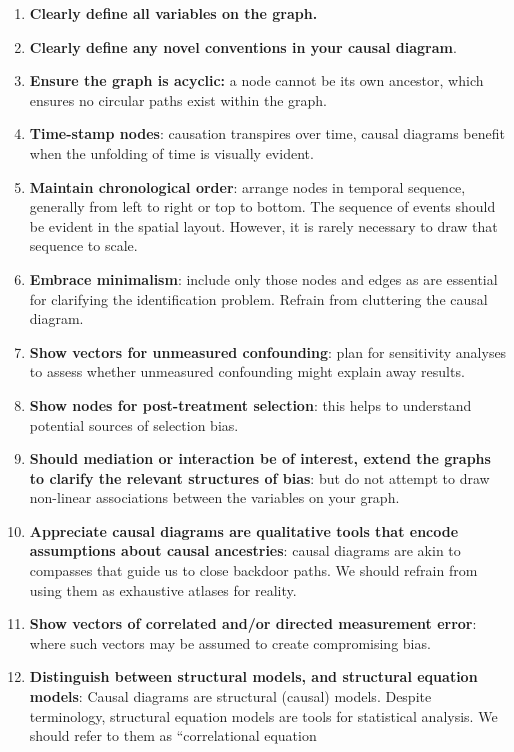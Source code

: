 \documentclass[
  singlecolumn]{article}
\begin{document}
\begin{enumerate}
\def\labelenumi{\arabic{enumi}.}
\item
  \textbf{Clearly define all variables on the graph.}
\item
  \textbf{Clearly define any novel conventions in your causal diagram}.
\item
  \textbf{Ensure the graph is acyclic:} a node cannot be its own
  ancestor, which ensures no circular paths exist within the graph.
\item
  \textbf{Time-stamp nodes}: causation transpires over time, causal
  diagrams benefit when the unfolding of time is visually evident.
\item
  \textbf{Maintain chronological order}: arrange nodes in temporal
  sequence, generally from left to right or top to bottom. The sequence
  of events should be evident in the spatial layout. However, it is
  rarely necessary to draw that sequence to scale.
\item
  \textbf{Embrace minimalism}: include only those nodes and edges as are
  essential for clarifying the identification problem. Refrain from
  cluttering the causal diagram.
\item
  \textbf{Show vectors for unmeasured confounding}: plan for sensitivity
  analyses to assess whether unmeasured confounding might explain away
  results.
\item
  \textbf{Show nodes for post-treatment selection}: this helps to
  understand potential sources of selection bias.
\item
  \textbf{Should mediation or interaction be of interest, extend the
  graphs to clarify the relevant structures of bias}: but do not attempt
  to draw non-linear associations between the variables on your graph.
\item
  \textbf{Appreciate causal diagrams are qualitative tools that encode
  assumptions about causal ancestries}: causal diagrams are akin to
  compasses that guide us to close backdoor paths. We should refrain
  from using them as exhaustive atlases for reality.
\item
  \textbf{Show vectors of correlated and/or directed measurement error}:
  where such vectors may be assumed to create compromising bias.
\item
  \textbf{Distinguish between structural models, and structural equation
  models}: Causal diagrams are structural (causal) models. Despite
  terminology, structural equation models are tools for statistical
  analysis. We should refer to them as ``correlational equation

\end{enumerate}
\end{document}
